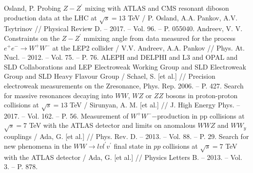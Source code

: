 	Osland, P. Probing $Z-Z^\prime$ mixing with ATLAS and CMS resonant diboson production data at the LHC at $\sqrt{s}=13$ TeV
	/ P. Osland, A.A. Pankov, A.V. Tsytrinov 
	// Physical Review D. – 2017. – Vol. 96. – P. 055040.
	Andreev, V. V. Constraints on the $Z-Z^\prime$ mmixing angle from data measured for the process $e^+e^- \rightarrow W^+W^-$ at the LEP2 collider
	/ V.V. Andreev, A.A. Pankov
	// Phys. At. Nucl. – 2012. – Vol. 75. – P. 76.
	ALEPH and DELPHI and L3 and OPAL and SLD Collaborations and LEP Electroweak Working Group and SLD Electroweak Group and SLD Heavy Flavour Group
	/ Schael, S. [et al.] 
	// Precision electroweak measurements on the Zresonance, Phys. Rep. 2006. – P. 427.
	Search for massive resonances decaying into $WW$, $WZ$ or $ZZ$ bosons in proton-proton collisions at $\sqrt{s}=13$ TeV
	/ Sirunyan, A. M. [et al.] 
	// J. High Energy Phys. – 2017. – Vol. 162. – P. 56.
	Measurement of $W^+W^-$−production in pp collisions at $\sqrt{s}=7$ TeV with the ATLAS detector and limits on anomalous $WWZ$ and $WW_y$ couplings
	/ Ada, G. [et al.] 
	// Phys. Rev. D. – 2013. – Vol. 88. – P. 29.
	Search for new phenomena in the $WW \rightarrow lvl^{\prime}v^{\prime}$ final state in $pp$ collisions at $\sqrt{s}=7$ TeV with the ATLAS detector
	/ Ada, G. [et al.] 
	// Physics Letters B. – 2013. – Vol. 3. – P. 878.
	




